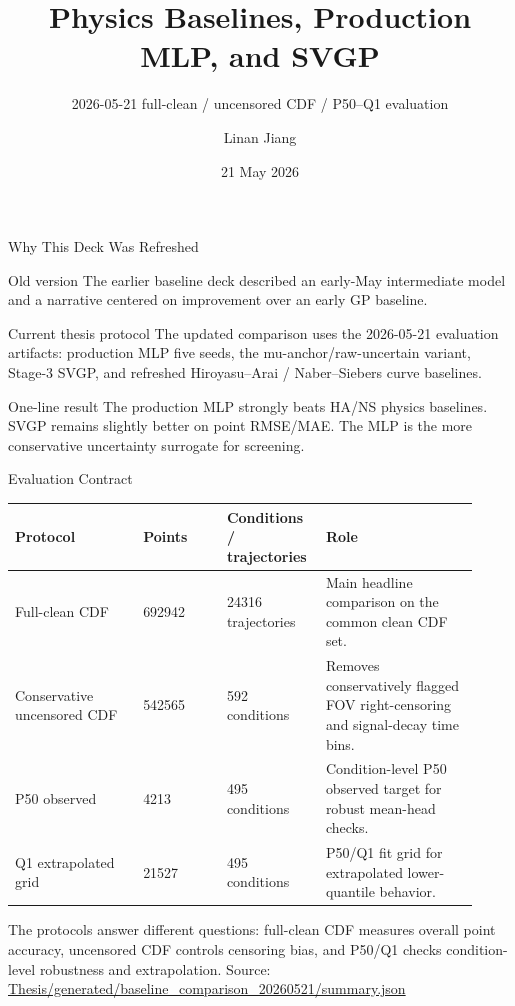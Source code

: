 \documentclass[aspectratio=169,11pt]{beamer}
\title[Baseline Comparison]{Physics Baselines, Production MLP, and SVGP}
\subtitle{2026-05-21 full-clean / uncensored CDF / P50--Q1 evaluation}
\author{Linan Jiang}
\institute{Aalto University}
\date{21 May 2026}
\newcommand{\good}[1]{\textcolor{goodGreen}{#1}}
\newcommand{\src}[1]{\vfill{\tiny\textcolor{gray!70!black}{Source: \url{#1}}}}
\begin{document}
\begin{frame}
  \titlepage
\end{frame}

\begin{frame}{Why This Deck Was Refreshed}
\small
\begin{block}{Old version}
The earlier baseline deck described an early-May intermediate model and a
narrative centered on improvement over an early GP baseline.
\end{block}

\begin{block}{Current thesis protocol}
The updated comparison uses the 2026-05-21 evaluation artifacts: production
MLP five seeds, the mu-anchor/raw-uncertain variant, Stage-3 SVGP, and refreshed
Hiroyasu--Arai / Naber--Siebers curve baselines.
\end{block}

\begin{block}{One-line result}
\good{The production MLP strongly beats HA/NS physics baselines. SVGP remains
slightly better on point RMSE/MAE. The MLP is the more conservative uncertainty
surrogate for screening.}
\end{block}
\end{frame}

\begin{frame}{Evaluation Contract}
\small
\begin{tabular}{L{0.26\linewidth}R{0.17\linewidth}R{0.18\linewidth}L{0.31\linewidth}}
\toprule
Protocol & Points & Conditions / trajectories & Role \\
\midrule
Full-clean CDF & \num{692942} & \num{24316} trajectories & Main headline comparison on the common clean CDF set. \\
Conservative uncensored CDF & \num{542565} & 592 conditions & Removes conservatively flagged FOV right-censoring and signal-decay time bins. \\
P50 observed & \num{4213} & 495 conditions & Condition-level P50 observed target for robust mean-head checks. \\
Q1 extrapolated grid & \num{21527} & 495 conditions & P50/Q1 fit grid for extrapolated lower-quantile behavior. \\
\bottomrule
\end{tabular}

\vspace{0.6em}
\footnotesize
The protocols answer different questions: full-clean CDF measures overall point
accuracy, uncensored CDF controls censoring bias, and P50/Q1 checks condition-level
robustness and extrapolation.
\src{Thesis/generated/baseline_comparison_20260521/summary.json}
\end{frame}
\end{document}
